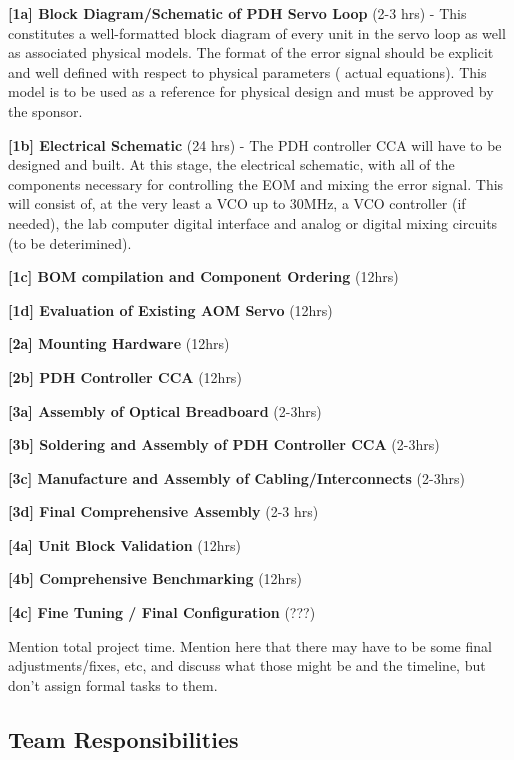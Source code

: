 \begin{packed_itemize}
  \item{\textbf{[1a] Block Diagram/Schematic of PDH Servo Loop} (2-3 hrs)}
  - This constitutes a well-formatted block diagram of every unit in the servo
  loop as well as associated physical models. The format of the error signal
  should be explicit and well defined with respect to physical parameters (
  actual equations). This model is to be used as a reference for physical
  design and must be approved by the sponsor.
  \item{\textbf{[1b] Electrical Schematic} (24 hrs)}
  - The PDH controller CCA will have to be designed and built. At this stage,
  the electrical schematic, with all of the components necessary for controlling
  the EOM and mixing the error signal. This will consist of, at the very least
  a VCO up to 30MHz, a VCO controller (if needed), the lab computer digital
  interface and analog or digital mixing circuits (to be deterimined).
  \item{\textbf{[1c] BOM compilation and Component Ordering} (12hrs)}
  \item{\textbf{[1d] Evaluation of Existing AOM Servo} (12hrs)}
  \item{\textbf{[2a] Mounting Hardware}} (12hrs)
  \item{\textbf{[2b] PDH Controller CCA} (12hrs)}
  \item{\textbf{[3a] Assembly of Optical Breadboard} (2-3hrs)}
  \item{\textbf{[3b] Soldering and Assembly of PDH Controller CCA} (2-3hrs)}
  \item{\textbf{[3c] Manufacture and Assembly of Cabling/Interconnects} (2-3hrs)}
  \item{\textbf{[3d] Final Comprehensive Assembly} (2-3 hrs)}
  \item{\textbf{[4a] Unit Block Validation} (12hrs)}
  \item{\textbf{[4b] Comprehensive Benchmarking} (12hrs)}
  \item{\textbf{[4c] Fine Tuning / Final Configuration} (???)}
\end{packed_itemize}

Mention total project time.
Mention here that there may have to be some final adjustments/fixes, etc, and
discuss what those might be and the timeline, but don't assign formal tasks to
them.

\subsection{Team Responsibilities} %

